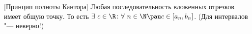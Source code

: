 [Принцип полноты Кантора]\label{ppk} Любая последовательность вложенных отрезков
  имеет общую точку. То есть $\exists\  c\in \R\colon \forall\  n\in\N\pau c\in [a_n,b_n]$. (Для интервалов "--- неверно!)
 